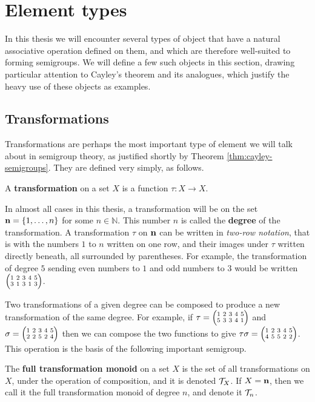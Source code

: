 \section{Element types}
\label{sec:element-types}

In this thesis we will encounter several types of object that have a natural
associative operation defined on them, and which are therefore well-suited to
forming semigroups.  We will define a few such objects in this section, drawing
particular attention to Cayley's theorem and its analogues, which justify the
heavy use of these objects as examples.

\subsection{Transformations}
\label{sec:transformations}

Transformations are perhaps the most important type of element we will talk
about in semigroup theory, as justified shortly by Theorem
\ref{thm:cayley-semigroups}.  They are defined very simply, as follows.

\begin{definition}
  \label{def:transformation}
  A \textbf{transformation} on a set $X$ is a function $\tau: X \to X$.
\end{definition}

In almost all cases in this thesis, a transformation will be on the set
$\mathbf{n} = \{1, \ldots, n\}$ for some $n \in \mathbb{N}$.  This number $n$ is called
the \textbf{degree} of the transformation. A transformation
$\tau$ on $\mathbf{n}$ can be written in \textit{two-row notation},  that is with the numbers $1$ to $n$ written on one row, and their
images under $\tau$ written directly beneath, all surrounded by parentheses.
For example, the transformation of degree $5$ sending even numbers to $1$ and
odd numbers to $3$ would be written $\transV31313$.

Two transformations of a given degree can be composed to produce a new
transformation of the same degree.  For example, if $\tau = \transV53341$ and
$\sigma = \transV22524$ then we can compose the two functions to give
$\tau\sigma = \transV45522$.  This operation is the basis of the following
important semigroup.

\begin{definition}
  \label{def:tn}
  The \textbf{full transformation monoid} on a set $X$ is the
  set of all transformations on $X$, under the operation of composition, and it
  is denoted $\mathcal{T}_X$.  If $X = \mathbf{n}$, then we call it the full transformation
  monoid of degree $n$, and denote it $\mathcal{T}_n$.
\end{definition}

